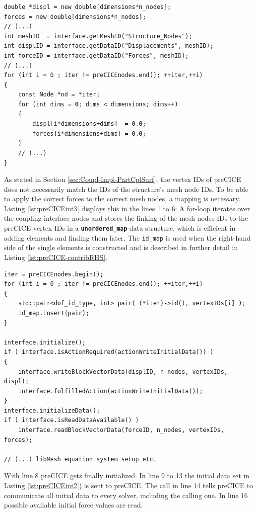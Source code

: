 \begin{lstlisting}[caption=preCICE Integration Part 2,label=lst:preCICEint2,keepspaces=true]
double *displ = new double[dimensions*n_nodes];
forces = new double[dimensions*n_nodes];
// (...)
int meshID  = interface.getMeshID("Structure_Nodes");
int displID = interface.getDataID("Displacements", meshID);
int forceID = interface.getDataID("Forces", meshID);
// (...)
for (int i = 0 ; iter != preCICEnodes.end(); ++iter,++i)
{
	const Node *nd = *iter;
	for (int dims = 0; dims < dimensions; dims++)
	{
		displ[i*dimensions+dims]  = 0.0;
		forces[i*dimensions+dims] = 0.0;
	}
	// (...)
}
\end{lstlisting}
   As stated in Section \ref{sec:Coupl-Impl-PartCplSurf}, the vertex IDs of preCICE does not necessarily match the IDs of the structure's mesh node IDs. To be able to apply the correct forces to the correct mesh nodes, a mapping is necessary. Listing \ref{lst:preCICEint3} displays this in the lines 1 to 6: A for-loop iterates over the coupling interface nodes and stores the linking of the mesh nodes IDs to the preCICE vertex IDs in a \texttt{\textbf{unordered\_map}}-data structure, which is efficient in adding elements and finding them later. The \texttt{id\_map} is used when the right-hand side of the single elements is constructed and is described in further detail in Listing \ref{lst:preCICE-contribRHS}.

\begin{lstlisting}[caption=preCICE Integration Part 3,label=lst:preCICEint3,keepspaces=true]
iter = preCICEnodes.begin();
for (int i = 0 ; iter != preCICEnodes.end(); ++iter,++i)
{
	std::pair<dof_id_type, int> pair( (*iter)->id(), vertexIDs[i] );
	id_map.insert(pair);
}

interface.initialize();
if ( interface.isActionRequired(actionWriteInitialData()) )
{
	interface.writeBlockVectorData(displID, n_nodes, vertexIDs, displ);
	interface.fulfilledAction(actionWriteInitialData());
}
interface.initializeData();
if ( interface.isReadDataAvailable() )
	interface.readBlockVectorData(forceID, n_nodes, vertexIDs, forces);

// (...) libMesh equation system setup etc.
\end{lstlisting}
   With line 8 preCICE gets finally initialized. In line 9 to 13 the initial data set in Listing \ref{lst:preCICEint2}) is sent to preCICE. The call in line 14 tells preCICE to communicate all initial data to every solver, including the calling one. In line 16 possible available initial force values are read.
   
